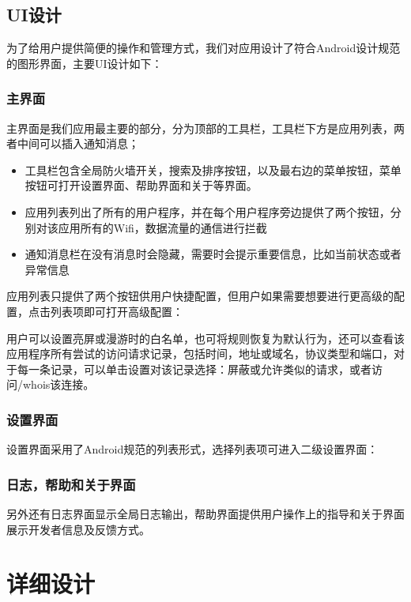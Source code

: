 \documentclass[format=final, language=chinese, degree=bachelor]{hustthesis}
\begin{document}
\section{UI设计}


为了给用户提供简便的操作和管理方式，我们对应用设计了符合Android设计规范的图形界面，主要UI设计如下：

\subsection{主界面}

主界面是我们应用最主要的部分，分为顶部的工具栏，工具栏下方是应用列表，两者中间可以插入通知消息；
\begin{itemize}
    \item 工具栏包含全局防火墙开关，搜索及排序按钮，以及最右边的菜单按钮，菜单按钮可打开设置界面、帮助界面和关于等界面。
    \item 应用列表列出了所有的用户程序，并在每个用户程序旁边提供了两个按钮，分别对该应用所有的Wifi，数据流量的通信进行拦截
    \item 通知消息栏在没有消息时会隐藏，需要时会提示重要信息，比如当前状态或者异常信息
\end{itemize}

应用列表只提供了两个按钮供用户快捷配置，但用户如果需要想要进行更高级的配置，点击列表项即可打开高级配置：


用户可以设置亮屏或漫游时的白名单，也可将规则恢复为默认行为，还可以查看该应用程序所有尝试的访问请求记录，包括时间，地址或域名，协议类型和端口，对于每一条记录，可以单击设置对该记录选择：屏蔽或允许类似的请求，或者访问/whois该连接。

\subsection{设置界面}

设置界面采用了Android规范的列表形式，选择列表项可进入二级设置界面：

\subsection{日志，帮助和关于界面}

另外还有日志界面显示全局日志输出，帮助界面提供用户操作上的指导和关于界面展示开发者信息及反馈方式。

\chapter{详细设计}
\end{document}
